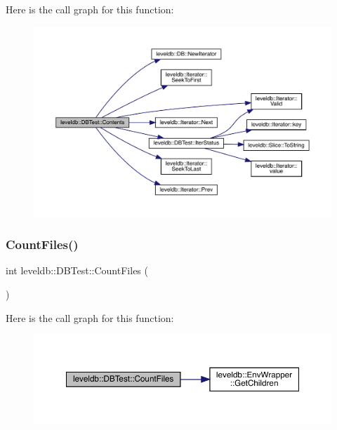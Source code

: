 Here is the call graph for this function\+:
\nopagebreak
\begin{figure}[H]
\begin{center}
\leavevmode
\includegraphics[width=350pt]{classleveldb_1_1_d_b_test_a3cf871664bd22c6ed2d6c2a8834b49fc_cgraph}
\end{center}
\end{figure}
\mbox{\label{classleveldb_1_1_d_b_test_a0c6c0c1d470a50fdcb6cdbc54977e907}} 
\subsubsection{\texorpdfstring{CountFiles()}{CountFiles()}}
{\footnotesize\ttfamily int leveldb\+::\+D\+B\+Test\+::\+Count\+Files (\begin{DoxyParamCaption}{ }\end{DoxyParamCaption})\hspace{0.3cm}{\ttfamily [inline]}}

Here is the call graph for this function\+:
\nopagebreak
\begin{figure}[H]
\begin{center}
\leavevmode
\includegraphics[width=350pt]{classleveldb_1_1_d_b_test_a0c6c0c1d470a50fdcb6cdbc54977e907_cgraph}
\end{center}
\end{figure}
\mbox{\label{classleveldb_1_1_d_b_test_a68db410e16195a3b67822bec05c06547}} 
